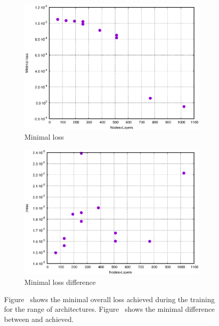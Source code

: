 \begin{figure}[htbp]
    \centering
    \begin{subfigure}[b]{0.45\textwidth}
        \centering
        \includegraphics[width=\textwidth]{figures_simpleNN/minimal_loss.eps}
        \caption{Minimal loss}
        \label{fig:minimal_loss}
    \end{subfigure}%
\quad
    \begin{subfigure}[b]{0.45\textwidth}
        \centering
        \includegraphics[width=\textwidth]{figures_simpleNN/minimal_diff.eps}
        \caption{Minimal loss difference}
        \label{fig:minimal_diff}
    \end{subfigure}
    \caption{Figure~ shows the minimal overall loss achieved during the training for the range of architectures. Figure~ shows the minimal difference between \losstrain and \losstest achieved.}
    \label{fig:net_complexity}
\end{figure}



